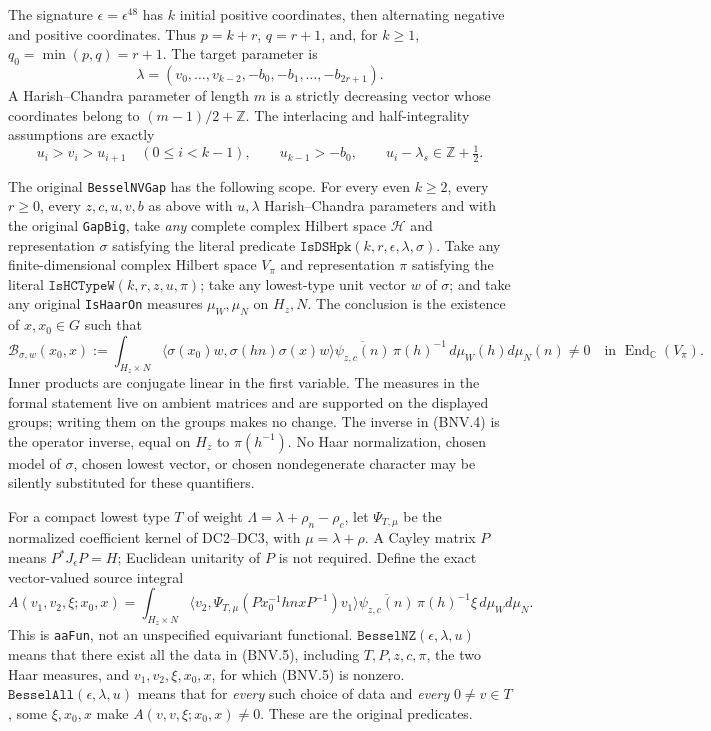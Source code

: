 The signature $\epsilon=\epsilon^{48}$ has $k$ initial positive coordinates,
then alternating negative and positive coordinates.  Thus
$p=k+r$, $q=r+1$, and, for $k\ge1$, $q_0=\min(p,q)=r+1$.
The target parameter is
\[
 \lambda=(v_0,\ldots,v_{k-2},-b_0,-b_1,\ldots,-b_{2r+1}).
 \tag{BNV.2}
\]
A Harish--Chandra parameter of length $m$ is a strictly decreasing vector
whose coordinates belong to $(m-1)/2+\mathbb Z$.  The interlacing and
half-integrality assumptions are exactly
\[
 u_i>v_i>u_{i+1}\quad(0\le i<k-1),\qquad u_{k-1}>-b_0,
 \qquad u_i-\lambda_s\in\mathbb Z+\tfrac12.
 \tag{BNV.3}
\]

The original \texttt{BesselNVGap} has the following scope.  For every even
$k\ge2$, every $r\ge0$, every $z,c,u,v,b$ as above with $u,\lambda$
Harish--Chandra parameters and with the original \texttt{GapBig}, take
\emph{any} complete complex Hilbert space $\mathcal H$ and representation
$\sigma$ satisfying the literal predicate
$\texttt{IsDSHpk}(k,r,\epsilon,\lambda,\sigma)$.  Take any finite-dimensional
complex Hilbert space $V_\pi$ and representation $\pi$ satisfying the literal
$\texttt{IsHCTypeW}(k,r,z,u,\pi)$; take any lowest-type unit vector $w$ of
$\sigma$; and take any original \texttt{IsHaarOn} measures $\mu_W,\mu_N$ on
$H_z,N$.  The conclusion is the existence of $x,x_0\in G$ such that
\[
 \mathcal B_{\sigma,w}(x_0,x):=
 \int_{H_z\times N}
 \langle\sigma(x_0)w,\sigma(hn)\sigma(x)w\rangle
 \overline{\psi_{z,c}(n)}\,\pi(h)^{-1}\,d\mu_W(h)d\mu_N(n)
 \ne0
 \quad\text{in }\operatorname{End}_{\mathbb C}(V_\pi).
 \tag{BNV.4}
\]
Inner products are conjugate linear in the first variable.  The measures in
the formal statement live on ambient matrices and are supported on the
displayed groups; writing them on the groups makes no change.  The inverse
in (BNV.4) is the operator inverse, equal on $H_z$ to $\pi(h^{-1})$.
No Haar normalization, chosen model of $\sigma$, chosen lowest vector, or
chosen nondegenerate character may be silently substituted for these
quantifiers.

For a compact lowest type $T$ of weight
$\Lambda=\lambda+\rho_n-\rho_c$, let $\Psi_{T,\mu}$ be the normalized
coefficient kernel of DC2--DC3, with $\mu=\lambda+\rho$.  A Cayley matrix
$P$ means $P^*J_\epsilon P=H$; Euclidean unitarity of $P$ is not required.
Define the exact vector-valued source integral
\[
 A(v_1,v_2,\xi;x_0,x)=
 \int_{H_z\times N}
 \langle v_2,\Psi_{T,\mu}(Px_0^{-1}hnxP^{-1})v_1\rangle
 \overline{\psi_{z,c}(n)}\,\pi(h)^{-1}\xi\,d\mu_Wd\mu_N.
 \tag{BNV.5}
\]
This is \texttt{aaFun}, not an unspecified equivariant functional.
$\texttt{BesselNZ}(\epsilon,\lambda,u)$ means that there exist all the data
in (BNV.5), including $T,P,z,c,\pi$, the two Haar measures, and
$v_1,v_2,\xi,x_0,x$, for which (BNV.5) is nonzero.
$\texttt{BesselAll}(\epsilon,\lambda,u)$ means that for \emph{every} such
choice of data and \emph{every} $0\ne v\in T$, some $\xi,x_0,x$ make
$A(v,v,\xi;x_0,x)\ne0$.  These are the original predicates.


